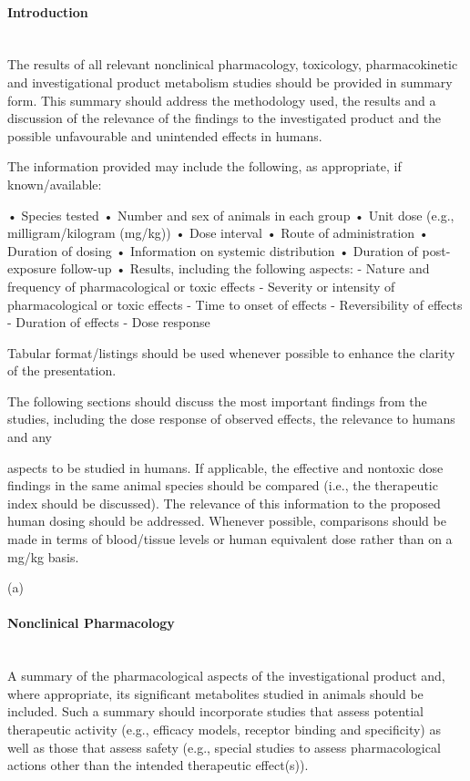 \documentclass[11pt]{article}
\begin{document}
\paragraph{Introduction}\mbox{}\\

The results of all relevant nonclinical pharmacology, toxicology, pharmacokinetic and investigational product metabolism studies should be provided in summary form. This summary should address the methodology used, the results and a discussion of the relevance of the findings to the investigated product and the possible unfavourable and unintended effects in humans.


The information provided may include the following, as appropriate, if known/available:


• Species tested • Number and sex of animals in each group • Unit dose (e.g., milligram/kilogram (mg/kg)) • Dose interval • Route of administration • Duration of dosing • Information on systemic distribution • Duration of post-exposure follow-up • Results, including the following aspects: - Nature and frequency of pharmacological or toxic effects - Severity or intensity of pharmacological or toxic effects - Time to onset of effects - Reversibility of effects - Duration of effects - Dose response


Tabular format/listings should be used whenever possible to enhance the clarity of the presentation.


The following sections should discuss the most important findings from the studies, including the dose response of observed effects, the relevance to humans and any


aspects to be studied in humans. If applicable, the effective and nontoxic dose findings in the same animal species should be compared (i.e., the therapeutic index should be discussed). The relevance of this information to the proposed human dosing should be addressed. Whenever possible, comparisons should be made in terms of blood/tissue levels or human equivalent dose rather than on a mg/kg basis.


(a)


\paragraph{Nonclinical Pharmacology}\mbox{}\\

A summary of the pharmacological aspects of the investigational product and, where appropriate, its significant metabolites studied in animals should be included. Such a summary should incorporate studies that assess potential therapeutic activity (e.g., efficacy models, receptor binding and specificity) as well as those that assess safety (e.g., special studies to assess pharmacological actions other than the intended therapeutic effect(s)).
\end{document}
